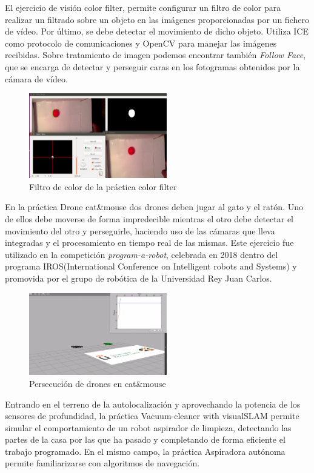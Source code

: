 \documentclass[12pt,spanish,chapterprefix, numbers=noenddot]{book}
\numberwithin{equation}{section}
\numberwithin{figure}{section}
\begin{document}
El ejercicio de visión color filter, permite configurar un filtro  de color para realizar un filtrado sobre un objeto en las imágenes proporcionadas por un fichero de vídeo. Por último, se debe detectar el movimiento de dicho objeto. Utiliza ICE como protocolo de comunicaciones y OpenCV para manejar las imágenes recibidas. 
Sobre tratamiento de imagen podemos encontrar también \textit{Follow Face}, que se encarga de detectar y perseguir caras en los fotogramas obtenidos por la cámara de vídeo\cite{Carlos}. 

\begin{figure}[hbt!]
\centering
\includegraphics[width=6cm]{Figs/colorFilter.png}
\par
\caption{\label{fig:colorFilter}Filtro de color de la práctica color filter}
\end{figure}

En la práctica Drone cat\&mouse dos drones deben jugar al gato y el ratón. Uno de ellos debe moverse de forma impredecible mientras el otro debe detectar el movimiento del otro y perseguirle, haciendo uso de las cámaras que lleva integradas y el procesamiento en tiempo real de las mismas. Este ejercicio fue utilizado en la competición \textit{program-a-robot}, celebrada en 2018 dentro del programa IROS(International Conference on Intelligent robots and Systems) y promovida por el grupo de robótica de la Universidad Rey Juan Carlos.

\begin{figure}[hbt!]
\centering
\includegraphics[width=6cm]{Figs/catMouse.png}
\par
\caption{\label{fig:catMouse}Persecución de drones en cat\&mouse}
\end{figure}

Entrando en el terreno de la autolocalización y aprovechando la potencia de los sensores de profundidad, la práctica Vacuum-cleaner with visualSLAM permite simular el comportamiento de un robot aspirador de limpieza, detectando las partes de la casa por las que ha pasado y completando de forma eficiente el trabajo programado. En el mismo campo, la práctica Aspiradora autónoma \cite{Vanessa} permite familiarizarse con algoritmos de navegación. 
\end{document}
